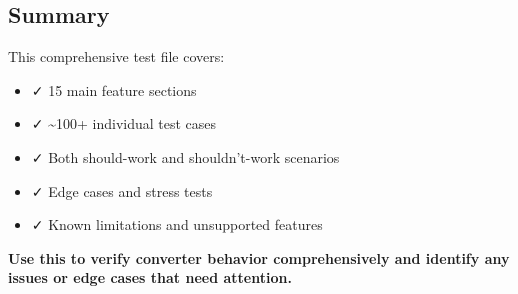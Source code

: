 \documentclass{article}
\begin{document}
\subsection{ Summary}

This comprehensive test file covers:

\begin{itemize}
\item  ✓ 15 main feature sections
\item  ✓ \~{}100+ individual test cases
\item  ✓ Both should-work and shouldn't-work scenarios
\item  ✓ Edge cases and stress tests
\item  ✓ Known limitations and unsupported features
\end{itemize}

\textbf{Use this to verify converter behavior comprehensively and identify any issues or edge cases that need attention.}
\end{document}
